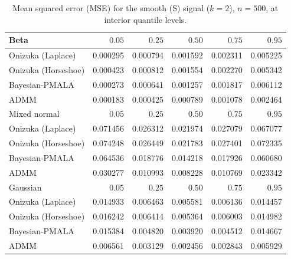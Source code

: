 \begin{table}[!htbp]
\centering
\small
\caption{Mean squared error (MSE) for the smooth (S) signal ($k=2$), $n=500$, at interior quantile levels.}
\label{tab:s_int_mse}
\begin{tabular}{lrrrrr}
\toprule
Beta & $0.05$ & $0.25$ & $0.50$ & $0.75$ & $0.95$ \\
\midrule
Onizuka (Laplace) & 0.000295 & 0.000794 & 0.001592 & 0.002311 & 0.005225 \\
Onizuka (Horseshoe) & 0.000423 & 0.000812 & 0.001554 & 0.002270 & 0.005342 \\
Bayesian-PMALA & 0.000273 & 0.000641 & 0.001257 & 0.001817 & 0.006112 \\
ADMM & 0.000183 & 0.000425 & 0.000789 & 0.001078 & 0.002464 \\
\midrule
Mixed normal & $0.05$ & $0.25$ & $0.50$ & $0.75$ & $0.95$ \\
\midrule
Onizuka (Laplace) & 0.071456 & 0.026312 & 0.021974 & 0.027079 & 0.067077 \\
Onizuka (Horseshoe) & 0.074248 & 0.026449 & 0.021783 & 0.027401 & 0.072335 \\
Bayesian-PMALA & 0.064536 & 0.018776 & 0.014218 & 0.017926 & 0.060680 \\
ADMM & 0.030277 & 0.010993 & 0.008228 & 0.010769 & 0.023342 \\
\midrule
Gaussian & $0.05$ & $0.25$ & $0.50$ & $0.75$ & $0.95$ \\
\midrule
Onizuka (Laplace) & 0.014933 & 0.006463 & 0.005581 & 0.006136 & 0.014457 \\
Onizuka (Horseshoe) & 0.016242 & 0.006414 & 0.005364 & 0.006003 & 0.014982 \\
Bayesian-PMALA & 0.015384 & 0.004820 & 0.003920 & 0.004512 & 0.014667 \\
ADMM & 0.006561 & 0.003129 & 0.002456 & 0.002843 & 0.005929 \\
\bottomrule
\end{tabular}
\end{table}

